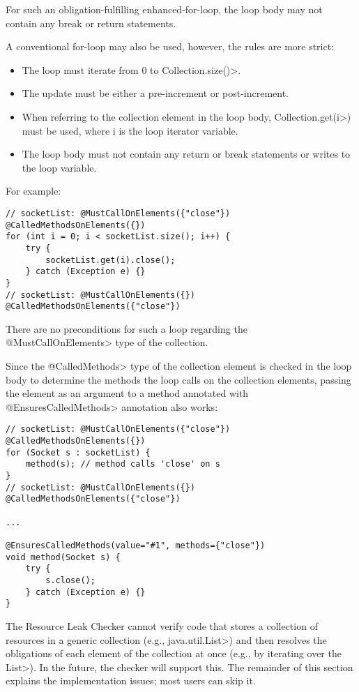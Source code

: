 For such an obligation-fulfilling enhanced-for-loop, the loop body may not contain any break or return statements.

A conventional for-loop may also be used, however, the rules are more strict:
\begin{itemize}
  \item The loop must iterate from 0 to \<Collection.size()>.
  \item The update must be either a pre-increment or post-increment.
  \item When referring to the collection element in the loop body, Collection.get(\<i>) must be used, where i is the loop iterator variable.
  \item The loop body must not contain any return or break statements or writes to the loop variable.
\end{itemize}

For example:
\begin{verbatim}
// socketList: @MustCallOnElements({"close"}) @CalledMethodsOnElements({})
for (int i = 0; i < socketList.size(); i++) {
    try {
        socketList.get(i).close();
    } catch (Exception e) {}
}
// socketList: @MustCallOnElements({}) @CalledMethodsOnElements({"close"})
\end{verbatim}

There are no preconditions for such a loop regarding the \<@MustCallOnElements> type of the collection.

Since the \<@CalledMethods> type of the collection element is checked in the loop body to determine the methods the loop calls on the collection elements, passing the element as an argument to a method annotated with \<@EnsuresCalledMethods> annotation also works:

\begin{verbatim}
// socketList: @MustCallOnElements({"close"}) @CalledMethodsOnElements({})
for (Socket s : socketList) {
    method(s); // method calls 'close' on s
}
// socketList: @MustCallOnElements({}) @CalledMethodsOnElements({"close"})

...

@EnsuresCalledMethods(value="#1", methods={"close"})
void method(Socket s) {
    try {
        s.close();
    } catch (Exception e) {}
}

\end{verbatim}

The Resource Leak Checker cannot verify code that stores a collection of
resources in a generic collection (e.g., \<java.util.List>) and then
resolves the obligations of each element of the collection at once (e.g.,
by iterating over the \<List>).  In the future, the checker will support
this.  The remainder of this section explains the implementation issues;
most users can skip it.

